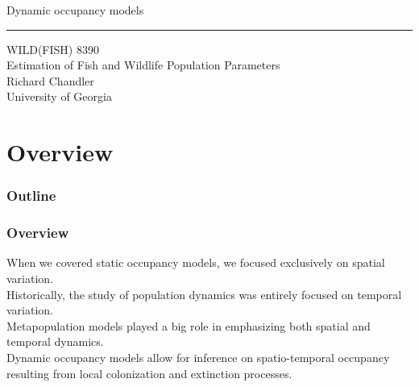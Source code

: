 \documentclass[color=usenames,dvipsnames]{beamer}\usepackage[]{graphicx}\usepackage[]{color}
\begin{document}
\begin{frame}[plain]
  \LARGE
  \centering
  {\huge %
    Dynamic occupancy models} \\
  {\color{default} \rule{\textwidth}{0.1pt}}
  \vfill
  \large
  WILD(FISH) 8390 \\
  Estimation of Fish and Wildlife Population Parameters \\
  \vfill
  Richard Chandler \\
  University of Georgia \\
\end{frame}






\section{Overview}



\begin{frame}[plain]
  \frametitle{Outline}
  \Large
\end{frame}



\begin{frame}
  \frametitle{Overview}
  When we covered static occupancy models, we focused exclusively on
  spatial variation. \\   
  \pause
  \vfill
  Historically, the study of population dynamics was entirely
  focused on temporal variation. \\
  \pause
  \vfill
  Metapopulation models played a big role in emphasizing both spatial
  and temporal dynamics. \\
  \pause
  \vfill
  Dynamic occupancy models allow for inference on spatio-temporal
  occupancy resulting from local colonization and extinction
  processes. \\
\end{frame}
\end{document}
